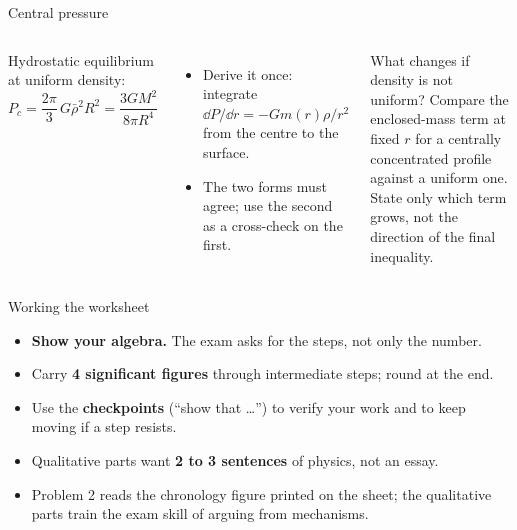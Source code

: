 \documentclass[aspectratio=169, 11pt]{beamer}
\begin{document}
\begin{frame}{Central pressure}
  \small
  \begin{columns}[T]
    Hydrostatic equilibrium at uniform density:
    \[
      \boxed{P_c = \frac{2\pi}{3}\,G\bar\rho^2 R^2 = \frac{3GM^2}{8\pi R^4}}
    \]
    \begin{itemize}
      \item Derive it once: integrate $\dd P/\dd r = -Gm(r)\rho/r^2$ from the centre to the surface.
      \item The two forms must agree; use the second as a cross-check on the first.
    \end{itemize}

    \begin{block}{What changes if density is not uniform?}
      Compare the enclosed-mass term at fixed $r$ for a centrally concentrated profile against a uniform one. State only which term grows, not the direction of the final inequality.
    \end{block}
  \end{columns}
  \vskip2pt\relax
\end{frame}

\begin{frame}{Working the worksheet}
  \begin{itemize}
    \item \textbf{Show your algebra.} The exam asks for the steps, not only the number.
    \item Carry \textbf{4 significant figures} through intermediate steps; round at the end.
    \item Use the \textbf{checkpoints} (``show that \ldots'') to verify your work and to keep moving if a step resists.
    \item Qualitative parts want \textbf{2 to 3 sentences} of physics, not an essay.
    \item Problem 2 reads the chronology figure printed on the sheet; the qualitative parts train the exam skill of arguing from mechanisms.
  \end{itemize}
  \vskip8pt\relax
\end{frame}
\end{document}
